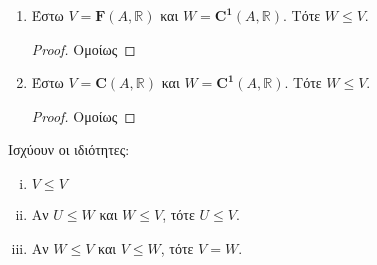 \begin{examples}
\begin{enumerate}
        \item Έστω $ V = \mathbf{F}(A, \mathbb{R}) $ και $ W = 
            \mathbf{C^{1}}(A, \mathbb{R}) $.  Τότε $ W \leq V $.  

            \begin{proof}
                Ομοίως
            \end{proof}

        \item Έστω $ V = \mathbf{C}(A, \mathbb{R}) $ και $ W = 
            \mathbf{C^{1}}(A, \mathbb{R}) $.  Τότε $ W \leq V $.  

            \begin{proof}
                Ομοίως
            \end{proof}
    \end{enumerate}
\end{examples}

\begin{prop}
    Ισχύουν οι ιδιότητες:
    \begin{enumerate}[i)]
        \item $ V \leq V $
        \item Αν $ U \leq W $ και $ W \leq V $, τότε $ U \leq V $.
        \item Αν $ W \leq V $ και $ V \leq W $, τότε $ V = W $.
    \end{enumerate}
\end{prop}


